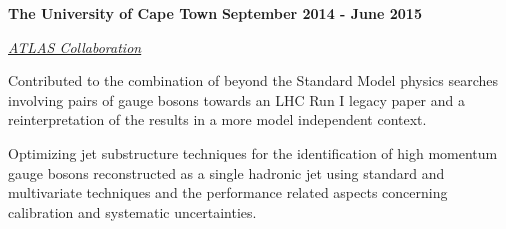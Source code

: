 \documentclass[10pt]{article}
\newenvironment{outerlist}[1][\enskip\textbullet]%
        {\begin{itemize}[#1]}{\end{itemize}%
         \vspace{-.6\baselineskip}}
\newenvironment{innerlist}[1][\enskip\textbullet]%
        {\begin{compactitem}[#1]}{\end{compactitem}}
\begin{document}
\vspace{3mm}

\textbf{The University of Cape Town} \hfill \textbf{September 2014 - June 2015}
\begin{outerlist}
\item[] \textit{\href{https://atlas.cern/}{ATLAS Collaboration}}%
        \begin{innerlist}
            \item Contributed to the combination of beyond the Standard Model physics searches involving pairs of gauge bosons towards an LHC Run I legacy paper and a reinterpretation of the results in a more model independent context.
            \item Optimizing jet substructure techniques for the identification of high momentum gauge bosons reconstructed as a single hadronic jet using standard and multivariate techniques and the performance related aspects concerning calibration and systematic uncertainties.
        \end{innerlist}
\end{outerlist}

\vspace{3mm}
\end{document}
